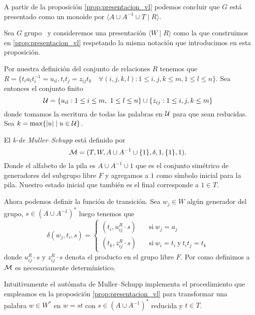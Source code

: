 \documentclass[tesis.tex]{subfiles}
\begin{document}
	\begin{obs}
		A partir de la proposición \ref{prop:presentacion_vl} podemos concluir que $G$ está presentado como un monoide por $\langle A \cup A^{-1} \cup T \mid R \rangle$.
	\end{obs}

	Sea $G$ grupo \vl  \ y consideremos una presentación $\langle W  \mid  R \rangle$ como la que construimos en \ref{prop:presentacion_vl} respetando la misma notación que introducimos en esta proposición.
	
	Por nuestra definición del conjunto de relaciones $R$ tenemos que $R = \{t_ia_{l}t_i^{-1} = u_{il},  t_it_j = z_{ij}t_k \quad \forall (i,j,k,l) :   1 \le i,j,k \le m, 1 \le l  \le n \}$. 
	Sea entonces el conjunto finito 
	\[
	{\cal U} =  \{u_{il} : 1 \le i \le m, \ 1 \le l \le n \}  \cup  \{z_{ij} : 1 \le i,j,k \le m\} 
	\]
	donde tomamos la escritura de todas las palabras en $\cal{U}$ para que sean reducidas.
	Sea $k = \max \{ |u| \mid u \in \cal U \}$. 
	
	\begin{deff}
		El \emph{k-\APD de Muller--Schupp } está definido por 
		\[
		{\cal M }= (T, W , A \cup A^{-1} \cup \{ 1 \}, \delta, 1, \{1\}, 1).
		\]
		Donde el alfabeto de la pila es $A \cup A^{-1} \cup 1$ que es el conjunto simétrico de generadores del subgrupo libre $F$ y agregamos a $1$ como símbolo inicial para la pila.
		Nuestro estado inicial que también es el final corresponde a $1 \in T$.
	
		Ahora podemos definir la función de transición. 
		Sea $w_{j} \in W$ algún generador del grupo, $s \in (A \cup A^{-1})^{*}$ luego tenemos que
		\[
		\delta(w_j,t_i, s) =
		\begin{cases}
			(t_{i}, u_{ij}^{R} \cdot s ) \quad 
			&\text{si} \ w_{j}=a_{j} \\
			(t_{k},  z_{ij}^{R} \cdot s ) \quad 
			&\text{si} \ w_{i}=t_{i} \ \text{y} \ t_{i}t_{j} = t_{k}
		\end{cases}\]
		donde $u_{ij}^{R} \cdot s$ y $z_{ij}^{R} \cdot s$ denota el producto en el grupo libre $F$.
		Por como definimos a $\cal M$ es necesariamente determínistico.
	\end{deff}

	Intuitivamente el autómata de Muller--Schupp implementa el procedimiento que empleamos en la proposición \ref{prop:presentacion_vl} para transformar una palabra $w \in W^*$ en $w = st$ con $s \in (A \cup A^{-1})^{*}$ reducida y $t \in T$.
\end{document}
